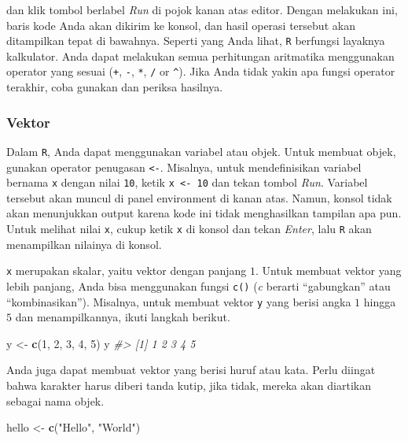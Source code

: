 \documentclass[
  oneside]{book}
\newenvironment{Shaded}{\begin{snugshade}}{\end{snugshade}}
\newcommand{\CommentTok}[1]{\textcolor[rgb]{0.56,0.35,0.01}{\textit{#1}}}
\newcommand{\DecValTok}[1]{\textcolor[rgb]{0.00,0.00,0.81}{#1}}
\newcommand{\FunctionTok}[1]{\textcolor[rgb]{0.13,0.29,0.53}{\textbf{#1}}}
\newcommand{\NormalTok}[1]{#1}
\newcommand{\OtherTok}[1]{\textcolor[rgb]{0.56,0.35,0.01}{#1}}
\newcommand{\StringTok}[1]{\textcolor[rgb]{0.31,0.60,0.02}{#1}}
\begin{document}
dan klik tombol berlabel \emph{Run} di pojok kanan atas editor. Dengan melakukan ini, baris kode Anda akan dikirim ke konsol, dan hasil operasi tersebut akan ditampilkan tepat di bawahnya. Seperti yang Anda lihat, \texttt{R} berfungsi layaknya kalkulator. Anda dapat melakukan semua perhitungan aritmatika menggunakan operator yang sesuai (\texttt{+}, \texttt{-}, \texttt{*}, \texttt{/} or
\texttt{\textasciicircum{}}). Jika Anda tidak yakin apa fungsi operator terakhir, coba gunakan dan periksa hasilnya.

\subsubsection*{Vektor}\label{vektor}

Dalam \texttt{R}, Anda dapat menggunakan variabel atau objek. Untuk membuat objek, gunakan operator penugasan \texttt{<-}. Misalnya, untuk mendefinisikan variabel bernama \texttt{x} dengan nilai \texttt{10}, ketik \texttt{x\ \textless{}-\ 10} dan tekan tombol \emph{Run}. Variabel tersebut akan muncul di panel environment di kanan atas. Namun, konsol tidak akan menunjukkan output karena kode ini tidak menghasilkan tampilan apa pun. Untuk melihat nilai \texttt{x}, cukup ketik \texttt{x} di konsol dan tekan \emph{Enter}, lalu \texttt{R} akan menampilkan nilainya di konsol.

\texttt{x} merupakan skalar, yaitu vektor dengan panjang \(1\). Untuk membuat vektor yang lebih panjang, Anda bisa menggunakan fungsi \texttt{c()} (\emph{c} berarti ``gabungkan'' atau ``kombinasikan''). Misalnya, untuk membuat vektor \texttt{y} yang berisi angka \(1\) hingga \(5\) dan menampilkannya, ikuti langkah berikut.

\begin{Shaded}
\begin{Highlighting}[]
\NormalTok{y }\OtherTok{\textless{}{-}} \FunctionTok{c}\NormalTok{(}\DecValTok{1}\NormalTok{, }\DecValTok{2}\NormalTok{, }\DecValTok{3}\NormalTok{, }\DecValTok{4}\NormalTok{, }\DecValTok{5}\NormalTok{)}
\NormalTok{y}
\CommentTok{\#\textgreater{} [1] 1 2 3 4 5}
\end{Highlighting}
\end{Shaded}

Anda juga dapat membuat vektor yang berisi huruf atau kata. Perlu diingat bahwa karakter harus diberi tanda kutip, jika tidak, mereka akan diartikan sebagai nama objek.

\begin{Shaded}
\begin{Highlighting}[]
\NormalTok{hello }\OtherTok{\textless{}{-}} \FunctionTok{c}\NormalTok{(}\StringTok{"Hello"}\NormalTok{, }\StringTok{"World"}\NormalTok{)}
\end{Highlighting}
\end{Shaded}
\end{document}

